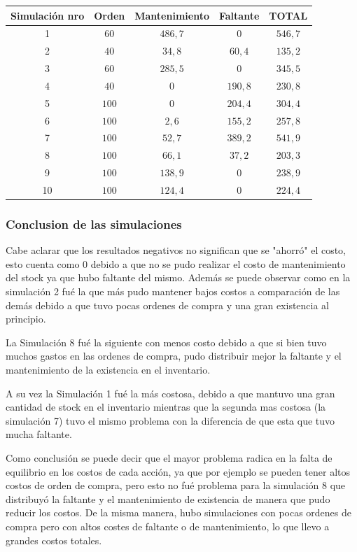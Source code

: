 \begin{tabular}{||c||c|c|c|c||}
    \hline \hline
    Simulación nro & Orden & Mantenimiento & Faltante & TOTAL\\
    \hline \hline
    1 & $60$ & $486,7$ & $0$ & $546,7$\\
    \hline
    2 & $40$ & $34,8$ & $60,4$ & $135,2$\\
    \hline
    3 & $60$ & $285,5$ & $0$ & $345,5$\\
    \hline
    4 & $40$ & $0$ & $190,8$ & $230,8$\\
    \hline
    5 & $100$ & $0$ & $204,4$ & $304,4$\\
    \hline
    6 & $100$ & $2,6$ & $155,2$ & $257,8$\\
    \hline
    7 & $100$ & $52,7$ & $389,2$ & $541,9$\\
    \hline
    8 & $100$ & $66,1$ & $37,2$ & $203,3$\\
    \hline
    9 & $100$ & $138,9$ & $0$ & $238,9$\\
    \hline
    10 & $100$ & $124,4$ & $0$ &$224,4$\\
    \hline \hline
\end{tabular}

\subsubsection{Conclusion de las simulaciones}\label{subsubsec:conclusiones}
Cabe aclarar que los resultados negativos no significan que se "ahorró" el costo, esto cuenta como 0 debido a que no se pudo realizar el costo de mantenimiento del stock ya que hubo faltante del mismo.
Además se puede observar como en la simulación 2 fué la que más pudo mantener bajos costos a comparación de las demás debido a que tuvo pocas ordenes de compra y una gran existencia al principio.

La Simulación 8 fué la siguiente con menos costo debido a que si bien tuvo muchos gastos en las ordenes de compra, pudo distribuir mejor la faltante y el mantenimiento de la existencia en el inventario.

A su vez la Simulación 1 fué la más costosa, debido a que mantuvo una gran cantidad de stock en el inventario mientras que la segunda mas costosa (la simulación 7) tuvo el mismo problema con la diferencia de que esta que tuvo mucha faltante.

Como conclusión se puede decir que el mayor problema radica en la falta de equilibrio en los costos de cada acción, ya que por ejemplo se pueden tener altos costos de orden de compra, pero esto no fué problema para la simulación 8 que distribuyó la faltante y el mantenimiento de existencia de manera que pudo reducir los costos.
De la misma manera, hubo simulaciones con pocas ordenes de compra pero con altos costes de faltante o de mantenimiento, lo que llevo a grandes costos totales.
